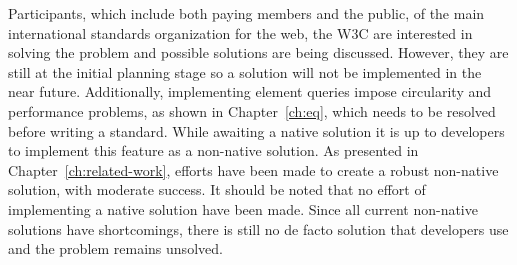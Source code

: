 \documentclass[a4paper,11pt]{kth-mag}
\begin{document}
      Participants, which include both paying members and the public, of the main international standards organization for the \gls{web}, the \gls{W3C} are interested in solving the problem and possible solutions are being discussed.
      However, they are still at the initial planning stage \cite{ricg_site} so a solution will not be implemented  in the near future.
      Additionally, implementing element queries impose circularity and performance problems, as shown in Chapter~\ref{ch:eq}, which needs to be resolved before writing a standard.
      While awaiting a \gls{native} solution it is up to developers to implement this feature as a non-\gls{native} solution.
      As presented in Chapter~\ref{ch:related-work}, efforts have been made to create a robust non-\gls{native} solution, with moderate success.
      It should be noted that no effort of implementing a \gls{native} solution have been made.
      Since all current non-\gls{native} solutions have shortcomings, there is still no de facto solution that developers use and the problem remains unsolved.
\end{document}
